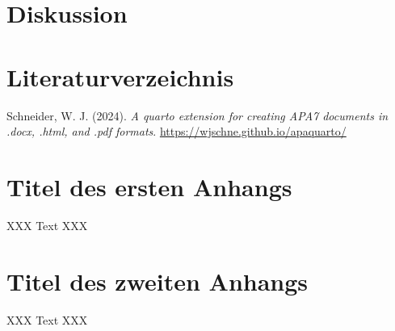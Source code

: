 \documentclass[
  stu,
  floatsintext,
  longtable,
  a4paper,
  nolmodern,
  notxfonts,
  notimes,
  donotrepeattitle,
  colorlinks=true,linkcolor=blue,citecolor=blue,urlcolor=blue]{apa7}
\newlength{\cslhangindent}
\newenvironment{CSLReferences}[2] %
 {\begin{list}{}{%
  \setlength{\itemindent}{0pt}
  \setlength{\leftmargin}{0pt}
  \setlength{\parsep}{0pt}
  \ifodd #1
   \setlength{\leftmargin}{\cslhangindent}
   \setlength{\itemindent}{-1\cslhangindent}
  \fi
  \setlength{\itemsep}{#2\baselineskip}}}
 {\end{list}}
\begin{document}
\section{Diskussion}\label{diskussion}

\newpage

\section*{Literaturverzeichnis}\label{literaturverzeichnis}

\label{refs}
\begin{CSLReferences}{1}{0}
Schneider, W. J. (2024). \emph{A quarto extension for creating APA7
documents in .docx, .html, and .pdf formats}.
\url{https://wjschne.github.io/apaquarto/}

\end{CSLReferences}

\newpage
\appendix

\section{Titel des ersten Anhangs}\label{titel-des-ersten-anhangs}

XXX Text XXX

\section{Titel des zweiten Anhangs}\label{titel-des-zweiten-anhangs}

XXX Text XXX
\end{document}

